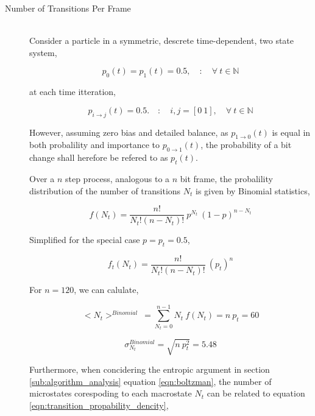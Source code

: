 			\begin{description}
				\item[Number of Transitions Per Frame] \hfill \\
					
					Consider a particle in a symmetric, descrete time-dependent, two state system,

					\begin{equation}
						p_0(t) = p_1(t) = 0.5, \quad : \quad \forall\ t \in \mathbb{N}
					\end{equation}

					at each time itteration,

					\begin{equation}
						p_{i \to j}(t) = 0.5. \quad : \quad i,j = [0\ 1], \quad \forall\ t \in \mathbb{N}
					\end{equation}

					However, assuming zero bias and detailed balance, as $p_{1 \to 0}(t)$ is equal in both probalility and importance to $p_{0 \to 1}(t)$, the probability of a bit change shall herefore be refered to as $p_{t}(t)$.
					\par
					Over a $n$ step process, analogous to a $n$ bit frame, the probalility distribution of the number of transitions $N_t$ is given by Binomial statistics,

					\begin{equation}
						f(N_{t}) = \frac{n!}{N_{t}!(n-N_{t})!}\ p^{N_{t}}\ (1 - p)^{n-N_{t}}
					\end{equation}

					Simplified for the special case $p = p_{t} = 0.5$,

					\begin{equation}
						f_{t}(N_{t}) = \frac{n!}{N_{t}!(n-N_{t})!}\ (p_{t})^{n}
						\label{eqn:transition_propability_dencity}
					\end{equation}

					For $n = 120$, we can calulate,

					\begin{equation}
						<N_t>^{Binomial} \ = \sum_{N_{t}=0}^{n-1} N_{t}\ f(N_{t}) = n\ p_{t} = 60
						\label{eqn:tansition_expectation}
					\end{equation}

					\begin{equation}
						\sigma_{N_t}^{Binomial} = \sqrt{ n\ p_{t}^2} = 5.48
					\end{equation}

					Furthermore, when concidering the entropic argument in section \ref{sub:algorithm_analysis} equation \ref{eqn:boltzman}, the number of microstates corespoding to each macrostate $N_t$ can be related to equation \ref{eqn:transition_propability_dencity},


\end{description}
